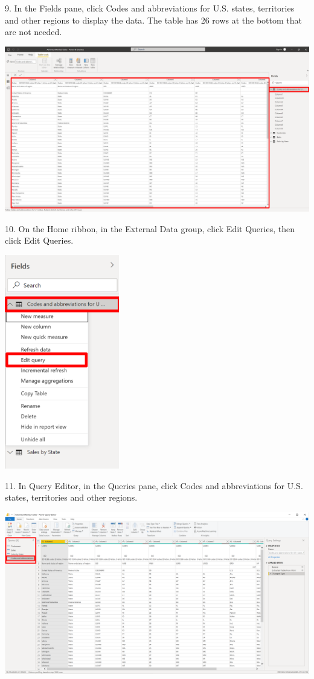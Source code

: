 \documentclass[12pt,letterpaper]{article}
\begin{document}
9. In the Fields pane, click Codes and abbreviations for U.S. states, territories and other regions to
display the data. The table has 26 rows at the bottom that are not needed.
\begin{center}
    \includegraphics[width=17cm]{img/47.png}  
\end{center}
10. On the Home ribbon, in the External Data group, click Edit Queries, then click Edit Queries.
\begin{center}
    \includegraphics[width=5cm]{img/48.png} 
    \vspace{1cm}  
\end{center}
11. In Query Editor, in the Queries pane, click Codes and abbreviations for U.S. states, territories and other
regions.
\begin{center}
    \includegraphics[width=17cm]{img/49.png}  
    \vspace{2cm} 
\end{center}
\end{document}

